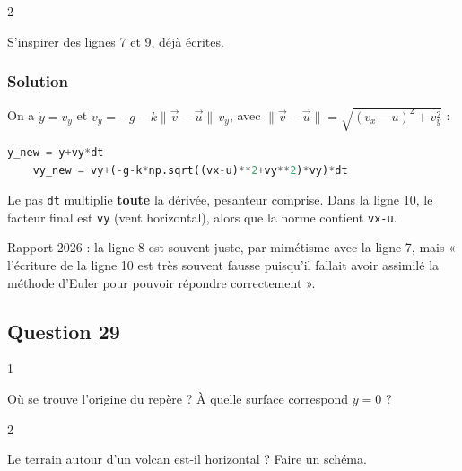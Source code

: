 \documentclass[11pt,a4paper]{article}
\begin{document}
\begin{indication}{2}

S'inspirer des lignes 7 et 9, déjà écrites.

\end{indication}

\hypertarget{solution-27}{%
\subsubsection{Solution}\label{solution-27}}

On a \(\dot y = v_y\) et \(\dot v_y = -g - k\|\vec v - \vec u\|\,v_y\), avec \(\|\vec v - \vec u\| = \sqrt{(v_x - u)^2 + v_y^2}\) :

\begin{lstlisting}[language=Python]
    y_new = y+vy*dt
    vy_new = vy+(-g-k*np.sqrt((vx-u)**2+vy**2)*vy)*dt
\end{lstlisting}

\begin{piege}

Le pas \texttt{dt} multiplie \textbf{toute} la dérivée, pesanteur comprise. Dans la ligne 10, le facteur final est \texttt{vy} (vent horizontal), alors que la norme contient \texttt{vx-u}.

\end{piege}

\begin{jury}

Rapport 2026 : la ligne 8 est souvent juste, par mimétisme avec la ligne 7, mais « l'écriture de la ligne 10 est très souvent fausse puisqu'il fallait avoir assimilé la méthode d'Euler pour pouvoir répondre correctement ».

\end{jury}

\hypertarget{question-29}{%
\subsection{Question 29}\label{question-29}}

\begin{indication}{1}

Où se trouve l'origine du repère ? À quelle surface correspond \(y = 0\) ?

\end{indication}

\begin{indication}{2}

Le terrain autour d'un volcan est-il horizontal ? Faire un schéma.

\end{indication}
\end{document}
